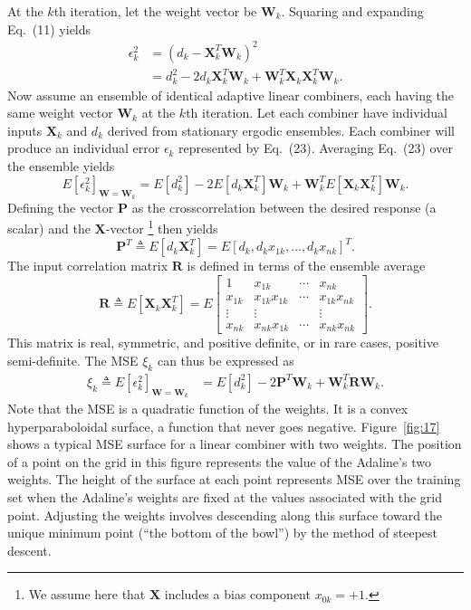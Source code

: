 \documentclass[10pt,twocolumn]{article}
\newcommand{\X}{\bm{X}}
\newcommand{\W}{\bm{W}}
\newcommand{\R}{\bm{R}}
\newcommand{\Pv}{\bm{P}}
\begin{document}
At the $k$th iteration, let the weight vector be $\W_k$. Squaring and expanding
Eq.~(11) yields
\begin{align}
\epsilon_k^2 &= (d_k - \X_k^{T}\W_k)^2 \tag{22}\\
&= d_k^2 - 2d_k\X_k^{T}\W_k + \W_k^{T}\X_k\X_k^{T}\W_k. \tag{23}
\end{align}
Now assume an ensemble of identical adaptive linear combiners, each having the same
weight vector $\W_k$ at the $k$th iteration. Let each combiner have individual
inputs $\X_k$ and $d_k$ derived from stationary ergodic ensembles. Each combiner
will produce an individual error $\epsilon_k$ represented by Eq.~(23). Averaging
Eq.~(23) over the ensemble yields
\begin{equation}
E[\epsilon_k^2]_{\W=\W_k} = E[d_k^2] - 2E[d_k\X_k^{T}]\W_k + \W_k^{T}E[\X_k\X_k^{T}]\W_k. \tag{24}
\end{equation}
Defining the vector $\Pv$ as the crosscorrelation between the desired response (a
scalar) and the $\X$-vector%
\footnote{We assume here that $\X$ includes a bias component $x_{0k} = +1$.}
then yields
\begin{equation}
\Pv^{T} \triangleq E[d_k\X_k^{T}] = E[d_k, d_k x_{1k}, \ldots, d_k x_{nk}]^{T}. \tag{25}
\end{equation}
The input correlation matrix $\R$ is defined in terms of the ensemble average
\begin{equation}
\R \triangleq E[\X_k\X_k^{T}]
= E\!\begin{bmatrix}
1 & x_{1k} & \cdots & x_{nk}\\
x_{1k} & x_{1k}x_{1k} & \cdots & x_{1k}x_{nk}\\
\vdots & \vdots & & \vdots\\
x_{nk} & x_{nk}x_{1k} & \cdots & x_{nk}x_{nk}
\end{bmatrix}. \tag{26}
\end{equation}
This matrix is real, symmetric, and positive definite, or in rare cases, positive
semi-definite. The MSE $\xi_k$ can thus be expressed as
\begin{align}
\xi_k \triangleq E[\epsilon_k^2]_{\W=\W_k}
&= E[d_k^2] - 2\Pv^{T}\W_k + \W_k^{T}\R\W_k. \tag{27}
\end{align}
Note that the MSE is a quadratic function of the weights. It is a convex
hyperparaboloidal surface, a function that never goes negative. Figure~\ref{fig:17}
shows a typical MSE surface for a linear combiner with two weights. The position of
a point on the grid in this figure represents the value of the Adaline's two
weights. The height of the surface at each point represents MSE over the training
set when the Adaline's weights are fixed at the values associated with the grid
point. Adjusting the weights involves descending along this surface toward the
unique minimum point (``the bottom of the bowl'') by the method of steepest
descent.
\end{document}
